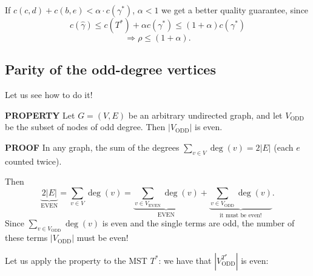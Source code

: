 If $c(c,d)+c(b,e)<\alpha\cdot c(\gamma^*)$, $\alpha<1$ we get a better quality guarantee, since
\[c(\widehat\gamma)\leq c(T^*)+\alpha c(\gamma^*)\leq(1+\alpha)c(\gamma^*)\]
\[\Rightarrow\rho\leq(1+\alpha).\]
\subsection{Parity of the odd-degree vertices}
Let us see how to do it!
\begin{notesresult}
\textbf{PROPERTY} Let $G=(V,E)$ be an arbitrary undirected graph, and let $V_{\mathrm{ODD}}$ be the subset of nodes of odd degree. Then $|V_{\mathrm{ODD}}|$ is even.
\end{notesresult}
\textbf{PROOF} In any graph, the sum of the degrees $\sum_{v\in V}\deg(v)=2|E|$ (each $e$ counted twice).

Then
\[\underbrace{2|E|}_{\text{EVEN}}=\sum_{v\in V}\deg(v)=\underbrace{\sum_{v\in V_{\mathrm{EVEN}}}\deg(v)}_{\text{EVEN}}+\underbrace{\sum_{v\in V_{\mathrm{ODD}}}\deg(v)}_{\text{it must be even!}}.\]
Since $\sum_{v\in V_{\mathrm{ODD}}}\deg(v)$ is even and the single terms are odd, the number of these terms $|V_{\mathrm{ODD}}|$ must be even!

Let us apply the property to the MST $T^*$: we have that $|V_{\mathrm{ODD}}^{T^*}|$ is even:
